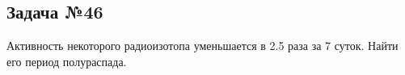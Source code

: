 \subsection{Задача №46}

Активность некоторого радиоизотопа уменьшается в 2.5 раза за 7 суток. Найти его период полураспада.